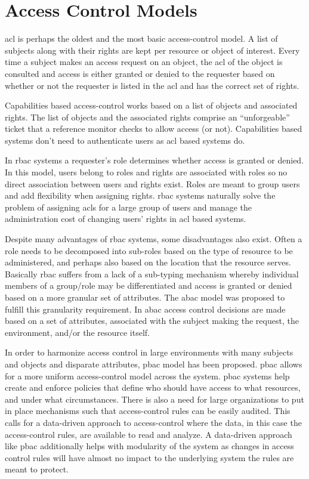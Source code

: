 \section{Access Control Models}\label{sec:models}


\ac{acl} is perhaps the oldest and the most basic access-control model. A list of subjects along with their rights are kept per resource or object of interest. Every time a subject makes an access request on an object, the \ac{acl} of the object is consulted and access is either granted or denied to the requester based on whether or not the requester is listed in the \ac{acl} and has the correct set of rights.

Capabilities based access-control works based on a list of objects and associated rights. The list of objects and the associated rights comprise an ``unforgeable'' ticket that a reference monitor checks to allow access (or not). Capabilities based systems don't need to authenticate users as \ac{acl} based systems do.

In \ac{rbac} systems a requester's role determines whether access is granted or denied. In this model, users belong to roles and rights are associated with roles so no direct association between users and rights exist. Roles are meant to group users and add flexibility when assigning rights. \ac{rbac} systems naturally solve the problem of assigning \ac{acl}s for a large group of users and manage the administration cost of changing users' rights in \ac{acl} based systems.


Despite many advantages of \ac{rbac} systems, some disadvantages also exist. Often a role needs to be decomposed into sub-roles based on the type of resource to be administered, and perhaps also based on the location that the resource serves. Basically \ac{rbac} suffers from a lack of a sub-typing mechanism whereby individual members of a group/role may be differentiated and access is granted or denied based on a more granular set of attributes. The \ac{abac} model was proposed to fulfill this granularity requirement. In \ac{abac} access control decisions are made based on a set of attributes, associated with the subject making the request, the environment, and/or the resource itself. 

In order to harmonize access control in large environments with many subjects and objects and disparate attributes, \ac{pbac} model has been proposed. \ac{pbac} allows for a more uniform access-control model across the system. \ac{pbac} systems help create and enforce policies
that define who should have access to what resources, and under what circumstances.
There is also a need for large organizations to put in place mechanisms such that access-control rules can be easily audited. This calls for a data-driven approach to access-control where the data, in this case the access-control rules, are available to read and analyze. A data-driven approach like \ac{pbac} additionally helps with modularity of the system as changes in access control rules will have almost no impact to the underlying system the rules are meant to protect.

